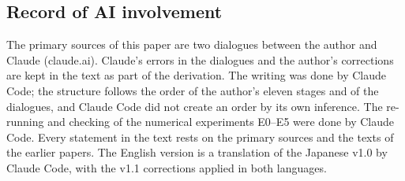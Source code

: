 \documentclass[
  a4paper,
]{article}
\begin{document}
\subsection{Record of AI involvement}\label{record-of-ai-involvement}

The primary sources of this paper are two dialogues between the author
and Claude (claude.ai). Claude's errors in the dialogues and the
author's corrections are kept in the text as part of the derivation. The
writing was done by Claude Code; the structure follows the order of the
author's eleven stages and of the dialogues, and Claude Code did not
create an order by its own inference. The re-running and checking of the
numerical experiments E0--E5 were done by Claude Code. Every statement
in the text rests on the primary sources and the texts of the earlier
papers. The English version is a translation of the Japanese v1.0 by
Claude Code, with the v1.1 corrections applied in both languages.
\end{document}
